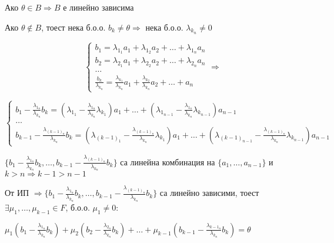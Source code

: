 \documentclass[fleqn,12pt]{article}
\begin{document}
\begin{flushleft}
Ако $ \theta \in B \Rightarrow B $ е линейно зависима

Ако $ \theta \notin B $, тоест нека б.о.о. $ b_k \neq \theta \Rightarrow $ нека б.о.о. $\lambda_{k_n} \neq 0 $

\begin{equation}
    \begin{cases}
        b_1 = \lambda_{1_1} a_1 + \lambda_{1_2} a_2 + \dots + \lambda_{1_n} a_n\\
        b_2 = \lambda_{2_1} a_1 + \lambda_{2_2} a_2 + \dots + \lambda_{2_n} a_n\\
        \dots\\
        \frac{b_k}{\lambda_{k_n}} = \frac{\lambda_{k_1}}{\lambda_{k_n}} a_1 + \frac{\lambda_{k_2}}{\lambda_{k_n}} a_2 + \dots + a_n
    \end{cases}
    \Rightarrow
\end{equation}

\begin{equation}
    \begin{cases}
        b_1 - \frac{\lambda_{1_n}}{\lambda_{k_n}} b_k = (\lambda_{1_1} - \frac{\lambda_{1_n}}{\lambda_{k_n}} \lambda_{k_1}) a_1 + \dots + (\lambda_{1_{n-1}} - \frac{\lambda_{1_n}}{\lambda_{k_n}} \lambda_{k_{n-1}}) a_{n-1}\\
        \dots\\
        b_{k-1} - \frac{\lambda_{{(k-1)}_n}}{\lambda_{k_n}} b_k = (\lambda_{{(k-1)}_1} - \frac{\lambda_{{(k-1)}_n}}{\lambda_{k_n}} \lambda_{k_1}) a_1 + \dots + (\lambda_{{(k-1)}_{n-1}} - \frac{\lambda_{{(k-1)}_n}}{\lambda_{k_n}} \lambda_{k_{n-1}}) a_{n-1}
    \end{cases}
\end{equation}

$ \{b_1 - \frac{\lambda_{1_n}}{\lambda_{k_n}} b_k, \dots, b_{k-1} - \frac{\lambda_{{(k-1)}_n}}{\lambda_{k_n}} b_k\} $ са линейна комбинация на $ \{a_1, \dots, a_{n-1} \} $ и $ k > n \Rightarrow k-1 > n - 1$

\vspace{5mm}

От ИП $ \Rightarrow \{ b_1 - \frac{\lambda_{1_n}}{\lambda_{k_n}} b_k, \dots, b_{k-1} - \frac{\lambda_{{(k-1)}_n}}{\lambda_{k_n}} b_k\} $ са линейно зависими, тоест $ \exists \mu_1, \dots, \mu_{k-1} \in F$, б.о.о. $\mu_1 \neq 0 $:

\vspace{5mm}

$ \mu_1 (b_1 - \frac{\lambda_{1_n}}{\lambda_{k_n}} b_k) + \mu_2 (b_2 - \frac{\lambda_{2_n}}{\lambda_{k_n}} b_k) + \dots + \mu_{k-1} (b_{k-1} - \frac{\lambda_{{k-1}_n}}{\lambda_{k_n}} b_k) = \theta$


\end{flushleft}
\end{document}
